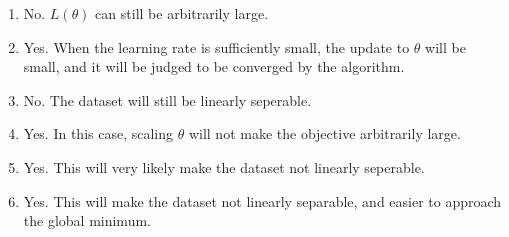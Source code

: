 \begin{answer}
\begin{enumerate}
    \item No. $L(\theta)$ can still be arbitrarily large.
  \item Yes. When the learning rate is sufficiently small, the update to $\theta$ will be small, and it will be judged to be converged by the algorithm.
  \item No. The dataset will still be linearly seperable.
  \item Yes. In this case, scaling $\theta$ will not make the objective arbitrarily large.
  \item Yes. This will very likely make the dataset not linearly seperable.
  \item Yes. This will make the dataset not linearly separable, and easier to approach the global minimum.
\end{enumerate}

\end{answer}

